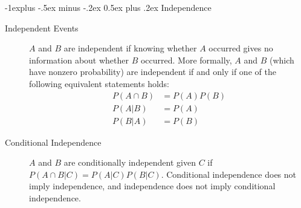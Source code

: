 \documentclass[10pt,landscape]{article}
\makeatletter
\renewcommand{\subsection}{\@startsection{subsection}{2}{0mm}%
                                {-1explus -.5ex minus -.2ex}%
                                {0.5ex plus .2ex}%
                                {\normalfont\normalsize\bfseries}}
\makeatother
\begin{document}
\begin{multicols*}{3}

\subsection{Independence}

    \begin{description}
        \item[Independent Events] $A$ and $B$ are independent if knowing whether $A$ occurred gives no information about whether $B$ occurred. More formally, $A$ and $B$ (which have nonzero probability) are independent if and only if one of the following equivalent statements holds: 
           \begin{align*} 
            P({A}\cap { B}) &= P({A})P({B}) \\
            P({ A}|{ B}) &= P({A})\\
            P(B|A) &= P(B)
           \end{align*}
        \item[Conditional Independence]  ${A}$ and ${B}$ are conditionally independent given ${C}$ if $P({A}\cap {B}|{C}) = P({A}|{C})P({B}|{C})$. Conditional independence does not imply independence, and independence does not imply conditional independence.
    \end{description}
    

\end{multicols*}
\end{document}
